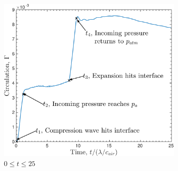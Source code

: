 \documentclass{article}
\begin{document}

\begin{figure}[!h]
  \centering
  \begin{subfigure}[b]{0.48\textwidth}
    \centering
    \includegraphics[width=\textwidth]{./figs/lung_figs/trapz10_circ_schematic}
    \caption{\label{fig:trapz10_circ_schematic_t25} $0\leq t \leq 25$ }
  \end{subfigure}
  ~
  \begin{subfigure}[b]{0.48\textwidth}
    \centering

\end{subfigure}
\end{figure}
\end{document}
